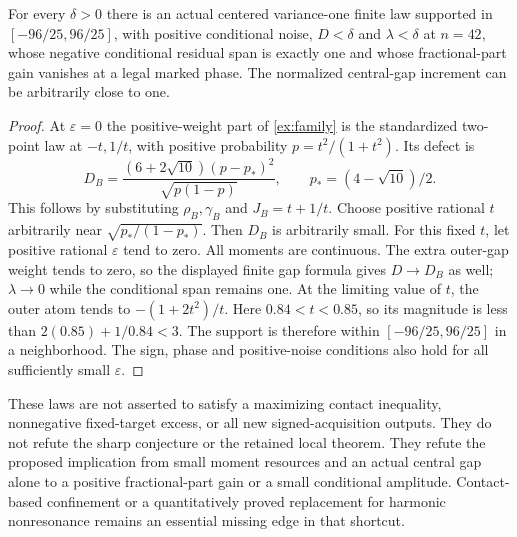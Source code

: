 \begin{corollary}\label{ex:arbitrary}
For every $\delta>0$ there is an actual centered variance-one finite law
supported in $[-96/25,96/25]$, with positive conditional noise,
$D<\delta$ and $\lambda<\delta$ at $n=42$, whose negative conditional
residual span is exactly one and whose fractional-part gain vanishes
at a legal marked phase. The normalized central-gap increment can be
arbitrarily close to one.
\end{corollary}
\begin{proof}
At $\varepsilon=0$ the positive-weight part of \eqref{ex:family} is
the standardized two-point law at $-t,1/t$, with positive probability
$p=t^2/(1+t^2)$. Its defect is
\[
 D_B=\frac{(6+2\sqrt{10})(p-p_*)^2}{\sqrt{p(1-p)}},
 \qquad p_*=(4-\sqrt{10})/2.
\]
This follows by substituting $\rho_B,\gamma_B$ and $J_B=t+1/t$.
Choose positive rational $t$ arbitrarily near
$\sqrt{p_*/(1-p_*)}$. Then $D_B$ is arbitrarily small.
For this fixed $t$, let positive rational $\varepsilon$ tend to zero.
All moments are continuous. The extra outer-gap weight tends to zero,
so the displayed finite gap formula gives $D\to D_B$ as well;
$\lambda\to0$ while the conditional span remains one.
At the limiting value of $t$, the outer atom tends to
$-(1+2t^2)/t$. Here $0.84<t<0.85$, so its magnitude is less than
$2(0.85)+1/0.84<3$. The support is therefore within
$[-96/25,96/25]$ in a neighborhood. The sign, phase and positive-noise
conditions also hold for all sufficiently small $\varepsilon$.
\end{proof}

These laws are not asserted to satisfy a maximizing contact inequality,
nonnegative fixed-target excess, or all new signed-acquisition outputs.
They do not refute the sharp conjecture or the retained local theorem.
They refute the proposed implication from small moment resources and an
actual central gap alone to a positive fractional-part gain or a small
conditional amplitude. Contact-based confinement or a quantitatively
proved replacement for harmonic nonresonance remains an essential missing
edge in that shortcut.
